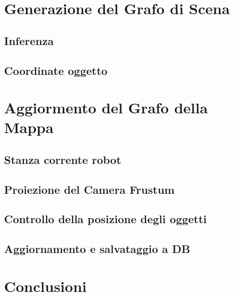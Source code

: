 \section{Generazione del Grafo di Scena}
\subsection{Inferenza}
\subsection{Coordinate oggetto}

\section{Aggiormento del Grafo della Mappa}
\subsection{Stanza corrente robot}
\subsection{Proiezione del Camera Frustum}
\subsection{Controllo della posizione degli oggetti}
\subsection{Aggiornamento e salvataggio a DB}



\section{Conclusioni}


